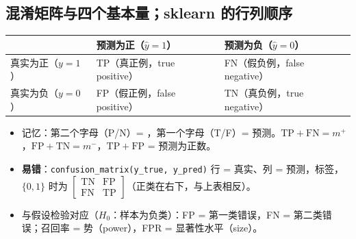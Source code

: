 \subsection{混淆矩阵与四个基本量；sklearn 的行列顺序}
\begin{center}\small\renewcommand{\arraystretch}{1.1}
\begin{tabular}{@{}lll@{}}
\toprule
 & 预测为正（$\hat y=1$）& 预测为负（$\hat y=0$）\\
\midrule
真实为正（$y=1$）& TP（真正例，true positive）& FN（假负例，false negative）\\
真实为负（$y=0$）& FP（假正例，false positive）& TN（真负例，true negative）\\
\bottomrule
\end{tabular}
\end{center}
\begin{itemize}
\item 记忆：第二个字母（P/N）= ，第一个字母（T/F）= 预测。$\mathrm{TP}+\mathrm{FN}=m^+$，$\mathrm{FP}+\mathrm{TN}=m^-$，$\mathrm{TP}+\mathrm{FP}$ = 预测为正数。
\item \textbf{易错}：\texttt{confusion\_matrix(y\_true, y\_pred)} 行 = 真实、列 = 预测，标签，$\{0,1\}$ 时为 $\left[\begin{smallmatrix}\mathrm{TN}&\mathrm{FP}\\ \mathrm{FN}&\mathrm{TP}\end{smallmatrix}\right]$（正类在右下，与上表相反）。
\item 与假设检验对应（$H_0$：样本为负类）：FP = 第一类错误，FN = 第二类错误；召回率 = 势（power），FPR = 显著性水平（size）。
\end{itemize}

